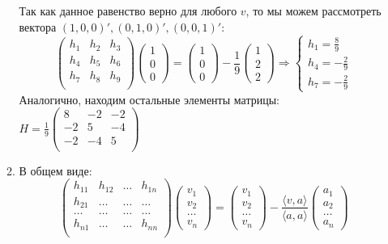\begin{enumerate}
\begin{enumerate}
	Так как данное равенство верно для любого $v$, то мы можем рассмотреть вектора $(1,0,0)', (0,1,0)', (0,0,1)'$:
	\[
	\begin{pmatrix}
	h_1 & h_2 & h_3 \\
	h_4 & h_5 & h_6 \\
	h_7 & h_8 & h_9 \\
	\end{pmatrix}
	\begin{pmatrix}
	1 \\ 0 \\ 0
	\end{pmatrix}
	=
	\begin{pmatrix}
	1 \\ 0 \\ 0
	\end{pmatrix}
	-
	\frac{1}{9}
	\begin{pmatrix}
	1 \\ 2 \\ 2
	\end{pmatrix}
	\Rightarrow
	\begin{cases}
	h_1 = \frac{8}{9} \\
	h_4 = -\frac{2}{9} \\
	h_7 = -\frac{2}{9}
	\end{cases}
	\]
	Аналогично, находим остальные элементы матрицы:
	$\displaystyle
	H = \frac{1}{9}
	\begin{pmatrix}
	8 & -2 & -2 \\
	-2 & 5 & -4 \\
	-2 & -4 & 5 \\
	\end{pmatrix}$
	\item
	В общем виде:
	\[
	\begin{pmatrix}
	h_{11} & h_{12} & \ldots & h_{1n} \\
	h_{21} & \ldots & \ldots & \ldots \\
	\ldots & \ldots & \ldots & \ldots \\
	h_{n1} & \ldots & \ldots & h_{nn} \\
	\end{pmatrix}
	\begin{pmatrix}
	v_1 \\ v_2 \\ \ldots \\ v_n
	\end{pmatrix}
	=
	\begin{pmatrix}
	v_1 \\ v_2 \\ \ldots \\ v_n
	\end{pmatrix}
	-
	\frac{\langle v,a \rangle}{\langle a,a \rangle}
	\begin{pmatrix}
	a_1 \\ a_2 \\ \ldots \\ a_n
	\end{pmatrix}
	\]
	

\end{enumerate}
\end{enumerate}
